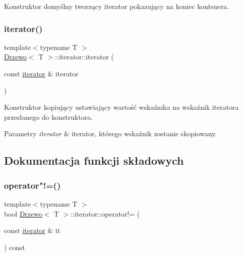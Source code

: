 Konstruktor domyślny tworzący iterator pokazujący na koniec kontenera. \mbox{\label{class_drzewo_1_1iterator_a627d8a55a11ad8be75493634c6fe07b2}} 
\subsubsection{\texorpdfstring{iterator()}{iterator()}\hspace{0.1cm}{\footnotesize\ttfamily [2/2]}}
{\footnotesize\ttfamily template$<$typename T $>$ \\
\hyperlink{class_drzewo}{Drzewo}$<$ T $>$\+::iterator\+::iterator (\begin{DoxyParamCaption}\item[{const \hyperlink{class_drzewo_1_1iterator}{iterator} \&}]{iterator }\end{DoxyParamCaption})\hspace{0.3cm}{\ttfamily [inline]}}

Konstruktor kopiujący ustawiający wartość wskaźnika na wskaźnik iteratora przesłanego do konstruktora.


\begin{DoxyParams}{Parametry}
{\em iterator} & iterator, którego wskaźnik zostanie skopiowany. \\
\hline
\end{DoxyParams}


\subsection{Dokumentacja funkcji składowych}
\mbox{\label{class_drzewo_1_1iterator_afb65420073bdc0e231f0752227de5dcc}} 
\subsubsection{\texorpdfstring{operator"!=()}{operator!=()}}
{\footnotesize\ttfamily template$<$typename T $>$ \\
bool \hyperlink{class_drzewo}{Drzewo}$<$ T $>$\+::iterator\+::operator!= (\begin{DoxyParamCaption}\item[{const \hyperlink{class_drzewo_1_1iterator}{iterator} \&}]{it }\end{DoxyParamCaption}) const\hspace{0.3cm}{\ttfamily [inline]}}

